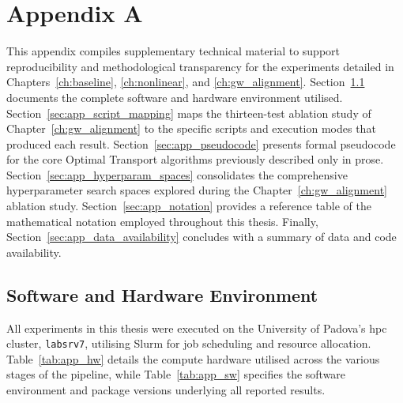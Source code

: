 \chapter{Appendix A}
\label{app:appendix_a}

This appendix compiles supplementary technical material to support reproducibility and methodological transparency for the experiments detailed in Chapters~\ref{ch:baseline}, \ref{ch:nonlinear}, and \ref{ch:gw_alignment}. Section~\ref{sec:app_environment} documents the complete software and hardware environment utilised. Section~\ref{sec:app_script_mapping} maps the thirteen-test ablation study of Chapter~\ref{ch:gw_alignment} to the specific scripts and execution modes that produced each result. Section~\ref{sec:app_pseudocode} presents formal pseudocode for the core Optimal Transport algorithms previously described only in prose. Section~\ref{sec:app_hyperparam_spaces} consolidates the comprehensive hyperparameter search spaces explored during the Chapter~\ref{ch:gw_alignment} ablation study. Section~\ref{sec:app_notation} provides a reference table of the mathematical notation employed throughout this thesis. Finally, Section~\ref{sec:app_data_availability} concludes with a summary of data and code availability.

\section{Software and Hardware Environment}
\label{sec:app_environment}

All experiments in this thesis were executed on the University of Padova's \gls{hpc} cluster, \texttt{labsrv7}, utilising Slurm for job scheduling and resource allocation. Table~\ref{tab:app_hw} details the compute hardware utilised across the various stages of the pipeline, while Table~\ref{tab:app_sw} specifies the software environment and package versions underlying all reported results.

